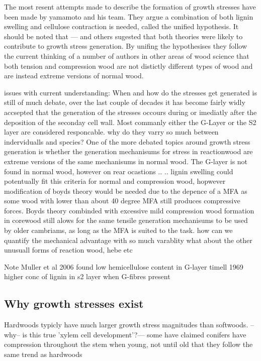 \documentclass{article}
\begin{document}
The most resent attempts made to describe the formation of growth stresses have
been made by yamamoto and his team. They argue a combination of both lignin
swelling and cellulose contraction is needed, called the unified hypothesis. It
should be noted that --- and others sugested that both theories were likely to
contribute to growth stress generation. By unifing the hypothesises they follow
the current thinking of a number of authors in other areas of wood science that
both tension and compression wood are not distictly different types of wood and
are instead extreme versions of normal wood.

issues with current understanding:
When and how do the stresses get generated is still of much debate, over the
last couple of decades it has become fairly widly accsepted that the generation
of the stresses occours during or imediatly after the deposition of the seconday
cell wall. Most commanly either the G-Layer or the S2 layer are considered
responcable.
why do they varry so much between indervidualls and species?
One of the more debated topics around growth stress generation is whether the
generation mechanisums for stress in reactionwood are extreme versions of the
same mechanisums in normal wood. The G-layer is not found in normal wood,
however on rear ocastions .. .. lignin swelling could potentually fit this
criteria for normal and compression wood, hopwever modification of boyds theory
would be needed due to the depence of a MFA as some wood with lower than about
40 degree MFA still produces compressive forces. Boyds theory combinded
with excessive mild compression wood formation in corewood still alows
for the same tensile generation mechanisums to be used by older cambriams, as
long as the MFA is suited to the task.
how can we quantify the mechanical advantage with so much varablity
what about the other unusuall forms of reaction wood, hebe etc

Note Muller et al 2006 found low hemicellulose content in G-layer
timell 1969 higher conc of lignin in s2 layer when G-fibres present

\subsection{Why growth stresses exist}
Hardwoods typicly have much larger growth stress magnitudes than softwoods.
--why-- is this true 'xylem cell development'?--- some have claimed conifers
have compression throughout the stem when young, not until old that they follow the same trend as
hardwoods
\end{document}
